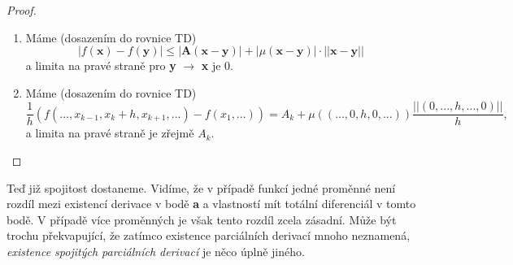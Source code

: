 \documentclass[../main.tex]{subfiles}
\begin{document}
\begin{proof}
	\begin{enumerate}
		\item Máme (dosazením do rovnice TD) \[|f(\textbf{x}) - f(\textbf{y})| \leq |\textbf{A}(\textbf{x}-\textbf{y})| + |\mu(\textbf{x}-\textbf{y})|\cdot||\textbf{x}-\textbf{y}||\]
		a limita na pravé straně pro \textbf{y} $\rightarrow$ \textbf{x} je 0.
		\item Máme (dosazením do rovnice TD) \[\frac{1}{h}(f(..., x_{k-1},x_k+h,x_{k+1},...) - f(x_1,...)) = A_k + \mu((...,0,h,0,...))\frac{||(0,...,h,...,0)||}{h},\]
		a limita na pravé straně je zřejmě $A_k$.
	\end{enumerate}
\end{proof}

Teď již spojitost dostaneme. Vidíme, že v případě funkcí jedné proměnné není rozdíl mezi existencí derivace v bodě \textbf{a} a vlastností
mít totální diferenciál v tomto bodě. V případě více proměnných je však tento rozdíl zcela zásadní. Může být trochu překvapující, že 
zatímco existence parciálních derivací mnoho neznamená, \textit{existence spojitých parciálních derivací} je něco úplně jiného.
\end{document}
